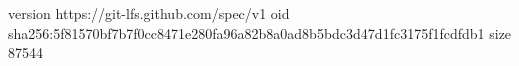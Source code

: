 version https://git-lfs.github.com/spec/v1
oid sha256:5f81570bf7b7f0cc8471e280fa96a82b8a0ad8b5bdc3d47d1fc3175f1fcdfdb1
size 87544
